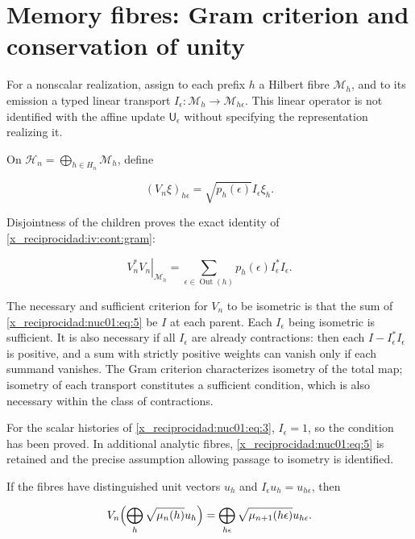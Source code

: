 \section{Memory fibres: Gram criterion and conservation of unity}

For a nonscalar realization, assign to each prefix \(h\) a Hilbert fibre \(\mathscr M_h\), and to its emission a typed linear transport
\(I_\epsilon:\mathscr M_h\to\mathscr M_{h\epsilon}\). This linear operator is not identified with the affine update \(\mathsf U_\epsilon\) without specifying the representation realizing it.

On \(\mathscr H_n=\bigoplus_{h\in H_n}\mathscr M_h\), define

\[
(V_n\xi)_{h\epsilon}=\sqrt{p_h(\epsilon)}I_\epsilon\xi_h.
\]

Disjointness of the children proves the exact identity of \cref{x_reciprocidad:iv:cont:gram}:

\begin{equation}
\left.V_n^*V_n\right|_{\mathscr M_h}
=\sum_{\epsilon\in\operatorname{Out}(h)}p_h(\epsilon)I_\epsilon^*I_\epsilon.
\label{x_reciprocidad:nuc01:eq:5}
\end{equation}

The necessary and sufficient criterion for \(V_n\) to be isometric is that the sum of \eqref{x_reciprocidad:nuc01:eq:5} be \(I\) at each parent. Each \(I_\epsilon\) being isometric is sufficient. It is also necessary if all \(I_\epsilon\) are already contractions: then each \(I-I_\epsilon^*I_\epsilon\) is positive, and a sum with strictly positive weights can vanish only if each summand vanishes. The Gram criterion characterizes isometry of the total map; isometry of each transport constitutes a sufficient condition, which is also necessary within the class of contractions.

For the scalar histories of \eqref{x_reciprocidad:nuc01:eq:3}, \(I_\epsilon=1\), so the condition has been proved. In additional analytic fibres, \eqref{x_reciprocidad:nuc01:eq:5} is retained and the precise assumption allowing passage to isometry is identified.

If the fibres have distinguished unit vectors \(u_h\) and \(I_\epsilon u_h=u_{h\epsilon}\), then

\begin{equation}
V_n\Bigl(\bigoplus_h\sqrt{\mu_n(h)}u_h\Bigr)
=\bigoplus_{h\epsilon}\sqrt{\mu_{n+1}(h\epsilon)}u_{h\epsilon}.
\label{x_reciprocidad:nuc01:eq:6}
\end{equation}

